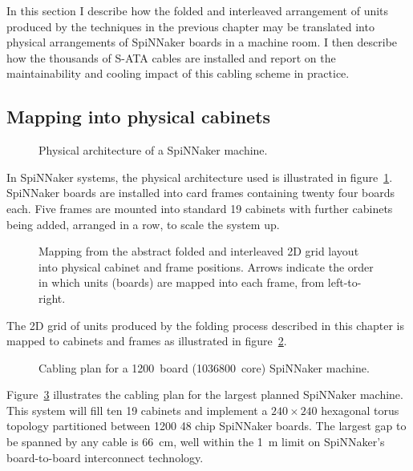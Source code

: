 		In this section I describe how the folded and interleaved arrangement of
		units produced by the techniques in the previous chapter may be translated
		into physical arrangements of SpiNNaker boards in a machine room. I then
		describe how the thousands of S-ATA cables are installed and report on the
		maintainability and cooling impact of this cabling scheme in practice.
		
		\subsection{Mapping into physical cabinets}
			
			\begin{figure}
				\center
				
				\caption{Physical architecture of a SpiNNaker machine.}
				\label{fig:cabinet-units}
			\end{figure}
			
			In SpiNNaker systems, the physical architecture used is illustrated in
			figure~\ref{fig:cabinet-units}. SpiNNaker boards are installed into card
			frames containing twenty four boards each. Five frames are mounted into
			standard 19\inch{} cabinets with further cabinets being added, arranged in
			a row, to scale the system up.
			
			\begin{figure}
				\center
				
				\caption{Mapping from the abstract folded and interleaved 2D grid
				layout into physical cabinet and frame positions. Arrows indicate the
				order in which units (boards) are mapped into each frame, from
				left-to-right.}
				\label{fig:cabinetisation}
			\end{figure}
			
			The 2D grid of units produced by the folding process described in this
			chapter is mapped to cabinets and frames as illustrated in
			figure~\ref{fig:cabinetisation}.
			
			\begin{figure}
				\center
				
				\caption{Cabling plan for a \num{1200}~board (\num{1036800}~core)
				SpiNNaker machine.}
				\label{fig:million-core-machine}
			\end{figure}
			
			Figure~\ref{fig:million-core-machine} illustrates the cabling plan for
			the largest planned SpiNNaker machine. This system will fill ten
			19\inch{} cabinets and implement a $240 \times 240$ hexagonal torus
			topology partitioned between \num{1200} 48 chip SpiNNaker boards. The
			largest gap to be spanned by any cable is \SI{66}{\centi\meter}, well
			within the \SI{1}{\meter} limit on SpiNNaker's board-to-board
			interconnect technology.
			
